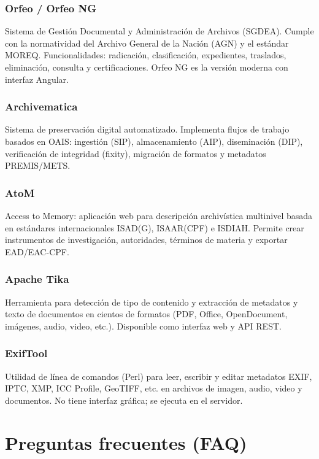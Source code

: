 \documentclass[12pt,a4paper]{report}
\begin{document}
\subsection{Orfeo / Orfeo NG}
Sistema de Gestión Documental y Administración de Archivos (SGDEA). Cumple
con la normatividad del Archivo General de la Nación (AGN) y el estándar
MOREQ. Funcionalidades: radicación, clasificación, expedientes, traslados,
eliminación, consulta y certificaciones. Orfeo NG es la versión moderna con
interfaz Angular.

\subsection{Archivematica}
Sistema de preservación digital automatizado. Implementa flujos de trabajo
basados en OAIS: ingestión (SIP), almacenamiento (AIP), diseminación (DIP),
verificación de integridad (fixity), migración de formatos y metadatos
PREMIS/METS.

\subsection{AtoM}
Access to Memory: aplicación web para descripción archivística multinivel
basada en estándares internacionales ISAD(G), ISAAR(CPF) e ISDIAH. Permite
crear instrumentos de investigación, autoridades, términos de materia y
exportar EAD/EAC-CPF.

\subsection{Apache Tika}
Herramienta para detección de tipo de contenido y extracción de metadatos y
texto de documentos en cientos de formatos (PDF, Office, OpenDocument,
imágenes, audio, video, etc.). Disponible como interfaz web y API REST.

\subsection{ExifTool}
Utilidad de línea de comandos (Perl) para leer, escribir y editar metadatos
EXIF, IPTC, XMP, ICC Profile, GeoTIFF, etc. en archivos de imagen, audio,
video y documentos. No tiene interfaz gráfica; se ejecuta en el servidor.

\chapter{Preguntas frecuentes (FAQ)}
\end{document}
